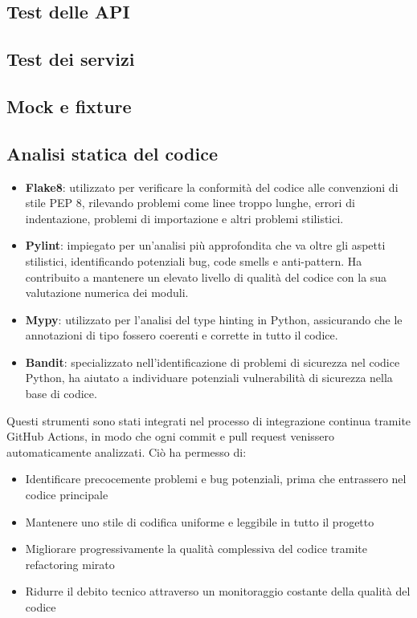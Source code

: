 \documentclass[12pt,a4paper,oneside]{report}
\begin{document}
\subsection{Test delle API}

\subsection{Test dei servizi}

\subsection{Mock e fixture}

\subsection{Analisi statica del codice}

\begin{itemize}
    \item \textbf{Flake8}: utilizzato per verificare la conformità del codice alle convenzioni di stile PEP 8, rilevando problemi come linee troppo lunghe, errori di indentazione, problemi di importazione e altri problemi stilistici.

    \item \textbf{Pylint}: impiegato per un'analisi più approfondita che va oltre gli aspetti stilistici, identificando potenziali bug, code smells e anti-pattern. Ha contribuito a mantenere un elevato livello di qualità del codice con la sua valutazione numerica dei moduli.

    \item \textbf{Mypy}: utilizzato per l'analisi del type hinting in Python, assicurando che le annotazioni di tipo fossero coerenti e corrette in tutto il codice.

    \item \textbf{Bandit}: specializzato nell'identificazione di problemi di sicurezza nel codice Python, ha aiutato a individuare potenziali vulnerabilità di sicurezza nella base di codice.
\end{itemize}

Questi strumenti sono stati integrati nel processo di integrazione continua tramite GitHub Actions, in modo che ogni commit e pull request venissero automaticamente analizzati. Ciò ha permesso di:

\begin{itemize}
    \item Identificare precocemente problemi e bug potenziali, prima che entrassero nel codice principale
    \item Mantenere uno stile di codifica uniforme e leggibile in tutto il progetto
    \item Migliorare progressivamente la qualità complessiva del codice tramite refactoring mirato
    \item Ridurre il debito tecnico attraverso un monitoraggio costante della qualità del codice
\end{itemize}
\end{document}
